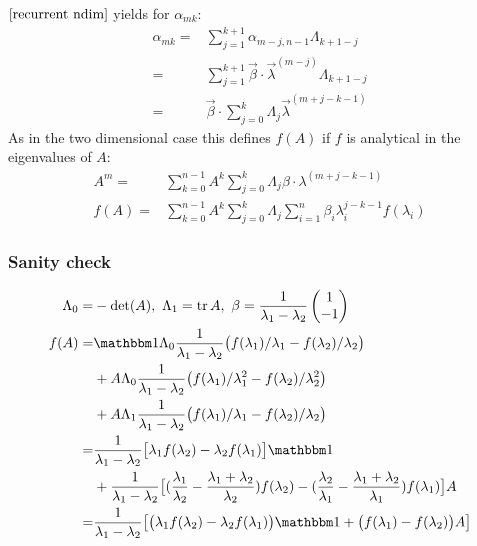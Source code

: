 \documentclass{article}
\begin{document}
$\eqref{recurrent ndim}$ yields for $\alpha_{mk}$:
\begin{align}
\alpha_{mk} =& \sum_{j=1}^{k+1} \alpha_{m-j,n-1} \Lambda_{k+1-j} \nonumber\\
=& \sum_{j=1}^{k+1} \vec\beta\cdot\vec\lambda^{(m-j)} \Lambda_{k+1-j} \nonumber\\
=& \vec\beta\cdot \sum_{j=0}^k \Lambda_j \vec\lambda^{(m+j-k-1)}
\end{align}
As in the two dimensional case this defines $f(A)$ if $f$ is analytical in the eigenvalues of $A$:
\begin{align}
A^m =& \sum_{k=0}^{n-1} A^k \sum_{j=0}^k \Lambda_j  \beta \cdot \lambda^{(m+j-k-1)}\\
f(A) =& \sum_{k=0}^{n-1} A^k \sum_{j=0}^k \Lambda_j \sum_{i=1}^n \beta_i \lambda_i^{j-k-1} f(\lambda_i)
\end{align}

\subsubsection*{Sanity check}
\begin{align*}
\Lambda_0 =& -\det(A),\ \Lambda_1 = \tr A,\ \beta = \frac 1 {\lambda_1 - \lambda_2}\begin{pmatrix} 1 \\ -1 \end{pmatrix}\\
f(A) =& \mathbbm 1 \Lambda_0 \frac 1{\lambda_1 - \lambda_2} \big(f(\lambda_1)/\lambda_1 - f(\lambda_2)/\lambda_2 \big)\\
&+ A \Lambda_0 \frac 1{\lambda_1 - \lambda_2} \big(f(\lambda_1)/\lambda_1^2 - f(\lambda_2)/\lambda_2^2 \big)\\
&+ A \Lambda_1 \frac 1{\lambda_1 - \lambda_2} \big(f(\lambda_1)/\lambda_1 - f(\lambda_2)/\lambda_2 \big)\\
=& \frac 1{\lambda_1-\lambda_2}\big[ \lambda_1f(\lambda_2) - \lambda_2f(\lambda_1) \big] \mathbbm 1 \\
&+ \frac 1{\lambda_1-\lambda_2}\big[ (\frac{\lambda_1}{\lambda_2} - \frac{\lambda_1+\lambda_2}{\lambda_2}) f(\lambda_2) - (\frac{\lambda_2}{\lambda_1} - \frac{\lambda_1+\lambda_2}{\lambda_1}) f(\lambda_1) \big] A\\
=& \frac 1{\lambda_1-\lambda_2}\big[ \big( \lambda_1f(\lambda_2) - \lambda_2f(\lambda_1) \big) \mathbbm 1 + \big(f(\lambda_1) - f(\lambda_2)\big) A\big] 
\end{align*}

\end{document}
